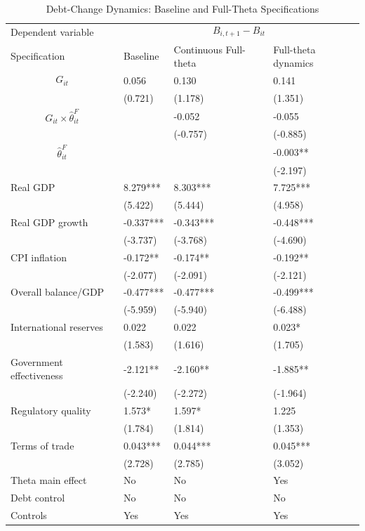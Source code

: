 \begin{table}[H]\centering
\begin{threeparttable}
\caption{Debt-Change Dynamics: Baseline and Full-Theta Specifications}
\label{tab:debt_change_combined_fulltheta}
\scriptsize
\begin{tabularx}{\textwidth}{lYYY}
\toprule
Dependent variable &  \\
\cmidrule(lr){2-4}
Specification & Baseline & Continuous Full-theta & Full-theta dynamics \\
\midrule
$$G_{it}$$ & 0.056 & 0.130 & 0.141 \\
 & (0.721) & (1.178) & (1.351) \\
$$G_{it}\times\widehat{\theta}^{F}_{it}$$ &  & -0.052 & -0.055 \\
 &  & (-0.757) & (-0.885) \\
$$\widehat{\theta}^{F}_{it}$$ &  &  & -0.003** \\
 &  &  & (-2.197) \\
Real GDP & 8.279*** & 8.303*** & 7.725*** \\
 & (5.422) & (5.444) & (4.958) \\
Real GDP growth & -0.337*** & -0.343*** & -0.448*** \\
 & (-3.737) & (-3.768) & (-4.690) \\
CPI inflation & -0.172** & -0.174** & -0.192** \\
 & (-2.077) & (-2.091) & (-2.121) \\
Overall balance/GDP & -0.477*** & -0.477*** & -0.499*** \\
 & (-5.959) & (-5.940) & (-6.488) \\
International reserves & 0.022 & 0.022 & 0.023* \\
 & (1.583) & (1.616) & (1.705) \\
Government effectiveness & -2.121** & -2.160** & -1.885** \\
 & (-2.240) & (-2.272) & (-1.964) \\
Regulatory quality & 1.573* & 1.597* & 1.225 \\
 & (1.784) & (1.814) & (1.353) \\
Terms of trade & 0.043*** & 0.044*** & 0.045*** \\
 & (2.728) & (2.785) & (3.052) \\
\midrule
Theta main effect & No & No & Yes \\
Debt control & No & No & No \\
Controls & Yes & Yes & Yes \\

\end{tabularx}
\end{threeparttable}
\end{table}
